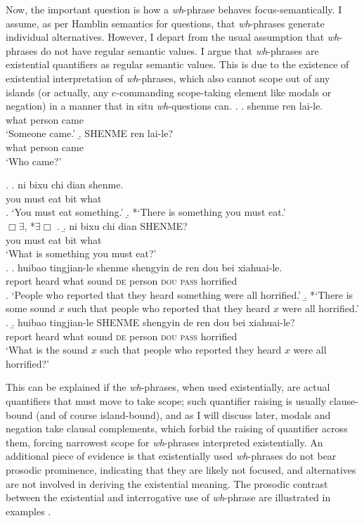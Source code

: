 \documentclass[12pt]{article}
\begin{document}
Now, the important question is how a \emph{wh}-phrase behaves focus-semantically.
I assume, as per Hamblin semantics for questions, that \emph{wh}-phrases generate individual alternatives.
However, I depart from the usual assumption that \emph{wh}-phrases do not have regular semantic values.
I argue that \emph{wh}-phrases are existential quantifiers as regular semantic values.
This is due to the existence of existential interpretation of \emph{wh}-phrases, which also cannot scope out of any islands (or actually, any c-commanding scope-taking element like modals or negation) in a manner that in situ \emph{wh}-questions can.
\ex. \label{itm:who-came}
\a. \gll 
shenme ren lai-le. \\
what person came \\
\glt `Someone came.'
\b. \gll 
SHENME ren lai-le? \\
what person came \\
\glt `Who came?'

\ex. \label{itm:must-eat-what}
\a. \gll 
ni bixu chi dian shenme. \\
you must eat bit what \\
\a. `You must eat something.'
\b. *`There is something you must eat.'\\
\(\Box \exists\), *\(\exists \Box\)
\z.
\b. \gll 
ni bixu chi dian SHENME? \\
you must eat bit what \\
\glt `What is something you must eat?'\\

\ex. \label{itm:heard-what-sound}
\a. \gll 
huibao tingjian-le shenme shengyin de ren dou bei xiahuai-le.\\
report heard what sound \textsc{de} person \textsc{dou} \textsc{pass} horrified \\
\a.  `People who reported that they heard something were all horrified.'
\b. *`There is some sound \(x\) such that people who reported that they heard \(x\) were all horrified.'
\z.
\b. \gll 
huibao tingjian-le SHENME shengyin de ren dou bei xiahuai-le?\\
report heard what sound \textsc{de} person \textsc{dou} \textsc{pass} horrified \\
\glt `What is the sound \(x\) such that people who reported they heard \(x\) were all horrified?'

This can be explained if the \emph{wh}-phrases, when used existentially, are actual quantifiers that must move to take scope; such quantifier raising is usually clause-bound (and of course island-bound), and as I will discuss later, modals and negation take clausal complements, which forbid the raising of quantifier across them, forcing narrowest scope for \emph{wh}-phrases interpreted existentially.
An additional piece of evidence is that existentially used \emph{wh}-phrases do not bear prosodic prominence, indicating that they are likely not focused, and alternatives are not involved in deriving the existential meaning.
The prosodic contrast between the existential and interrogative use of \emph{wh}-phrase are illustrated in examples .
\end{document}
